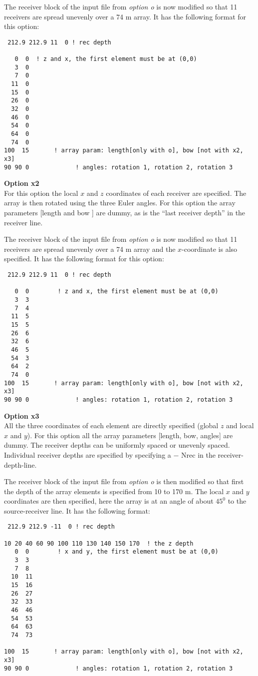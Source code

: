 \documentclass{saclantc}
\begin{document}
The receiver block of the input file from {\it option o} is now
modified so that 11 receivers are spread unevenly over a 74 m array.
It has the following format for this option:
\small
\begin{verbatim}
 212.9 212.9 11  0 ! rec depth

   0  0  ! z and x, the first element must be at (0,0) 
   3  0
   7  0
  11  0
  15  0
  26  0
  32  0
  46  0
  54  0
  64  0
  74  0
100  15       ! array param: length[only with o], bow [not with x2, x3]
90 90 0             ! angles: rotation 1, rotation 2, rotation 3
\end{verbatim}
\normalsize


{\large \bf Option x2}\\
For this option the local $x$ and $z$ coordinates of each receiver are
specified. The array is then rotated using the three Euler angles.
For this option the array parameters [length and bow ] are
dummy, as is the ``last receiver depth'' in the receiver line.

 The receiver block of the input file from {\it option o} is now
modified so that 11 receivers are spread unevenly over a 74 m array
and the $x$-coordinate is also specified.
It has the following format for this option:
\small
\begin{verbatim}
 212.9 212.9 11  0 ! rec depth

   0  0        ! z and x, the first element must be at (0,0) 
   3  3
   7  4
  11  5
  15  5
  26  6
  32  6
  46  5
  54  3
  64  2
  74  0
100  15       ! array param: length[only with o], bow [not with x2, x3]
90 90 0             ! angles: rotation 1, rotation 2, rotation 3
\end{verbatim}
\normalsize


{\large \bf Option x3}\\
All the three coordinates of each element are directly specified
(global $z$ and local $x$ and $y$).
For this option all the array parameters [length, bow, angles] are
dummy. The receiver depths can be uniformly spaced or unevenly
spaced. Individual receiver depths are specified by
specifying a $-$ Nrec in the receiver-depth-line.

The receiver block of the input file from {\it option o} is then
modified so that first the depth of the array elements is specified
from 10 to 170 m.  The local $x$ and $y$ coordinates are then specified,
here the array is at an angle of about $45^0$ to the source-receiver
line.
It has the
following format:
\small
\begin{verbatim}
 212.9 212.9 -11  0 ! rec depth

10 20 40 60 90 100 110 130 140 150 170  ! the z depth
   0  0        ! x and y, the first element must be at (0,0) 
   3  3
   7  8
  10  11
  15  16
  26  27
  32  33
  46  46
  54  53
  64  63
  74  73

100  15       ! array param: length[only with o], bow [not with x2, x3]
90 90 0             ! angles: rotation 1, rotation 2, rotation 3
\end{verbatim}
\normalsize
\end{document}
